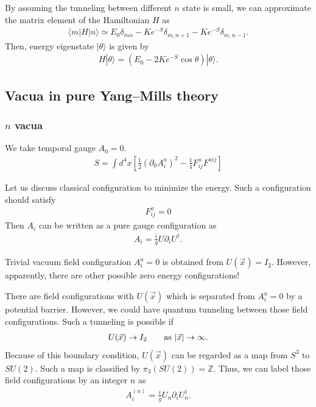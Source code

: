 \documentclass[11pt,a4paper]{article}
\begin{document}
By assuming the tunneling between different $n$ state is small, we can approximate the matrix element of the Hamiltonian $H$ as
\begin{align}
    \langle m | H | n \rangle \simeq E_0 \delta_{mn} - K e^{-S} \delta_{m,n+1} - K e^{-S} \delta_{m,n-1}.
\end{align}
Then, energy eigenstate $|\theta\rangle$ is given by
\begin{align}
    H |\theta\rangle = \left( E_0 - 2 K e^{-S} \cos\theta \right) |\theta\rangle.
\end{align}

\subsection{Vacua in pure Yang--Mills theory}

\subsubsection{$n$ vacua}
We take temporal gauge $A_0 = 0$.
\begin{align}
    S = \int d^4 x \left[ \frac{1}{2}(\partial_0 A_i^a)^2 - \frac{1}{4} F_{ij}^a F^{aij} \right]
\end{align}

Let us discuss classical configuration to minimize the energy. Such a configuration should satisfy
\begin{align}
    F_{ij}^a =0
\end{align}
Then $A_i$ can be written as a pure gauge configuration as
\begin{align}
    A_i = \frac{i}{g} U \partial_i U^\dagger.
\end{align}

Trivial vacuum field configuration $A_i^a = 0$ is obtained from $U(\vec x) = I_2$. However, apparently, there are other possible zero energy configurations!

There are field configurations with $U(\vec x)$ which is separated from $A_i^a = 0$ by a potential barrier. However, we could have quantum tunneling between those field configurations. Such a tunneling is possible if
\begin{align}
    U(\vec x) \to I_2 \qquad {\rm as}~|\vec x| \to \infty.
\end{align}
Because of this boundary condition, $U(\vec x)$ can be regarded as a map from $S^3$ to $SU(2)$. Such a map is classified by $\pi_3(SU(2)) = \mathbb{Z}$. Thus, we can label those field configurations by an integer $n$ as
\begin{align}
    A_i^{(n)} = \frac{i}{g} U_n \partial_i U_n^\dagger.
\end{align}
\end{document}

